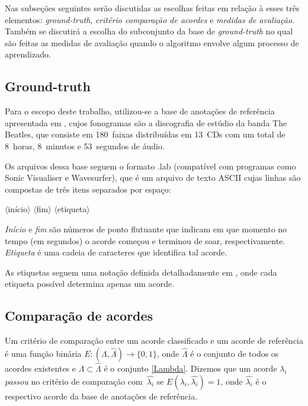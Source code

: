     Nas subseções seguintes serão discutidas as escolhas feitas em relação à esses três elementos: \textit{ground-truth}, \textit{critério comparação de acordes} e \textit{medidas de avaliação}. Também se discutirá a escolha do subconjunto da base de \textit{ground-truth} no qual são feitas as medidas de avaliação quando o algoritmo envolve algum processo de aprendizado.
    
    \subsection{Ground-truth}
        Para o escopo deste trabalho, utilizou-se a base de anotações de referência apresentada em \cite{harte}, cujos fonogramas são a discografia de estúdio da banda The Beatles, que consiste em 180~faixas distribuídas em 13~CDs com um total de 8~horas, 8~minutos e 53~segundos de áudio.
        
        Os arquivos dessa base seguem o formato .lab (compatível com programas como Sonic Visualiser e Wavesurfer), que é um arquivo de texto ASCII cujas linhas são compostas de três itens separados por espaço:
        
        \begin{center}
            $\langle$início$\rangle$
            $\langle$fim$\rangle$
            $\langle$etiqueta$\rangle$
        \end{center}
        
        \textit{Início} e \textit{fim} são números de ponto flutuante que indicam em que momento no tempo (em segundos) o acorde começou e terminou de soar, respectivamente. \textit{Etiqueta} é uma cadeia de caracteres que identifica tal acorde.
        
        As etiquetas seguem uma notação definida detalhadamente em \cite{harte}, onde cada etiqueta possível determina apenas um acorde.


    \subsection{Comparação de acordes}
        Um critério de comparação entre um acorde classificado e um acorde de referência é uma função binária $E: (\Lambda, \hat{\Lambda}) \rightarrow \{0, 1\}$, onde $\hat{\Lambda}$ é o conjunto de todos os acordes existentes e $\Lambda \subset \hat{\Lambda}$ é o conjunto \ref{Lambda}. Dizemos que um acorde $\lambda_i$ \textit{passou} no critério de comparação com~$\hat{\lambda_i}$ se $E(\lambda_i, \hat{\lambda_i}) = 1$, onde $\hat{\lambda_i}$ é o respectivo acorde da base de anotações de referência.
        
